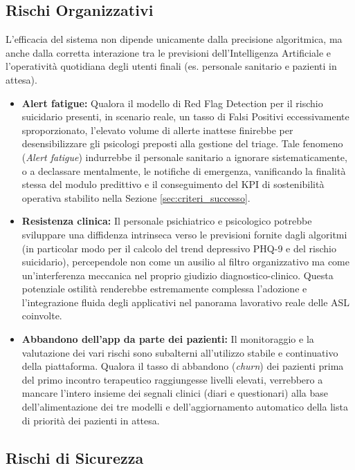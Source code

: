 \subsection*{Rischi Organizzativi}

L'efficacia del sistema non dipende unicamente dalla precisione algoritmica, ma anche dalla corretta interazione tra le previsioni dell'Intelligenza Artificiale e l'operatività quotidiana degli utenti finali (es. personale sanitario e pazienti in attesa).

\begin{itemize}
    \item \textbf{Alert fatigue:} Qualora il modello di Red Flag Detection per il rischio suicidario presenti, in scenario reale, un tasso di Falsi Positivi eccessivamente sproporzionato, l'elevato volume di allerte inattese finirebbe per desensibilizzare gli psicologi preposti alla gestione del triage. Tale fenomeno (\textit{Alert fatigue}) indurrebbe il personale sanitario a ignorare sistematicamente, o a declassare mentalmente, le notifiche di emergenza, vanificando la finalità stessa del modulo predittivo e il conseguimento del KPI di sostenibilità operativa stabilito nella Sezione \ref{sec:criteri_successo}.
    \item \textbf{Resistenza clinica:} Il personale psichiatrico e psicologico potrebbe sviluppare una diffidenza intrinseca verso le previsioni fornite dagli algoritmi (in particolar modo per il calcolo del trend depressivo PHQ-9 e del rischio suicidario), percependole non come un ausilio al filtro organizzativo ma come un'interferenza meccanica nel proprio giudizio diagnostico-clinico. Questa potenziale ostilità renderebbe estremamente complessa l'adozione e l'integrazione fluida degli applicativi nel panorama lavorativo reale delle ASL coinvolte.
    \item \textbf{Abbandono dell'app da parte dei pazienti:} Il monitoraggio e la valutazione dei vari rischi sono subalterni all'utilizzo stabile e continuativo della piattaforma. Qualora il tasso di abbandono (\textit{churn}) dei pazienti prima del primo incontro terapeutico raggiungesse livelli elevati, verrebbero a mancare l'intero insieme dei segnali clinici (diari e questionari) alla base dell'alimentazione dei tre modelli e dell'aggiornamento automatico della lista di priorità dei pazienti in attesa.
\end{itemize}

\subsection*{Rischi di Sicurezza}

